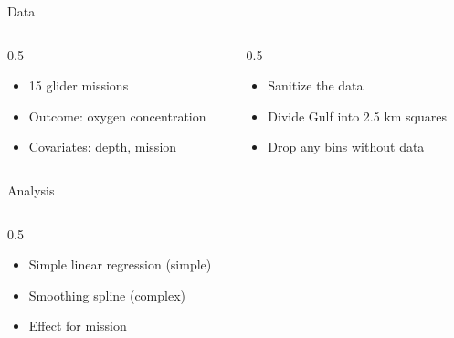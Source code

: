\documentclass[final]{beamer}
\newlength{\colwidth}
\begin{document}
\begin{frame}[t]
\begin{columns}[t]
\begin{column}{\colwidth}
  \begin{block}{Data}
  \begin{columns}[t]
    \begin{column}{0.5 \colwidth}
    \vspace{-30pt}
    \begin{itemize}
    \vspace{-15pt}
        \item 15 glider missions
        \item Outcome: oxygen concentration
        \item Covariates: depth, mission
    \end{itemize}
    \end{column}

      \begin{column}{0.5 \colwidth}
      \vspace{-30pt}
        \begin{itemize}
    \vspace{-15pt}
            \item Sanitize the data
            \item Divide Gulf into 2.5 km squares
            \item Drop any bins without data
        \end{itemize}
      \end{column}
      
  \end{columns}

  
\end{block}

\vspace{-15pt}

\begin{block}{Analysis}

\begin{columns}[t]
    \begin{column}{0.5 \colwidth}
    \vspace{-30pt}
        \begin{itemize}
    \vspace{-15pt}
            \item Simple linear regression (simple)
            \item Smoothing spline (complex)
            \item Effect for mission
        \end{itemize}
    \end{column}


\end{columns}
\end{block}
\end{column}
\end{columns}
\end{frame}
\end{document}
